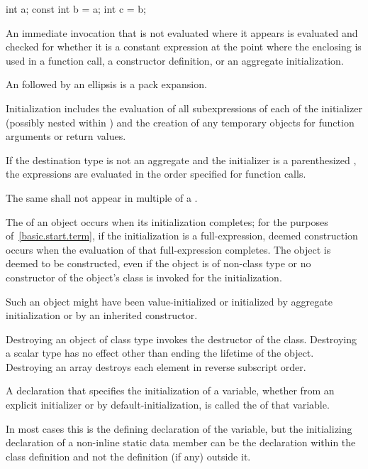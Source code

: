 \begin{itemize}
\begin{note}
\begin{codeblock}
int a;
const int b = a;
int c = b;
\end{codeblock}
\end{note}
\end{itemize}

\pnum
An immediate invocation that is not evaluated where
it appears
is evaluated and checked for whether it is
a constant expression at the point where
the enclosing  is used in
a function call, a constructor definition, or an aggregate initialization.

\pnum
An  followed by an ellipsis is a
pack expansion.

\pnum
Initialization includes
the evaluation of all subexpressions of
each  of
the initializer (possibly nested within ) and
the creation of any temporary objects for
function arguments or return values.

\pnum
If the destination type is not an aggregate
and the initializer is a parenthesized ,
the expressions are evaluated in the order
specified for function calls.

\pnum
The same 
shall not appear in multiple  of a
.

\pnum
The  of an object occurs when
its initialization completes;
for the purposes of~\ref{basic.start.term},
if the initialization is a full-expression,
deemed construction occurs when
the evaluation of that full-expression completes.
The object is deemed to be constructed,
even if the object is of non-class type or
no constructor of the object's class
is invoked for the initialization.
\begin{note}
Such an object might have been value-initialized
or initialized by aggregate initialization
or by an inherited constructor.
\end{note}
Destroying an object of class type invokes the destructor of the class.
Destroying a scalar type has no effect other than
ending the lifetime of the object.
Destroying an array destroys each element in reverse subscript order.

\pnum
A declaration that specifies the initialization of a variable,
whether from an explicit initializer or by default-initialization,
is called the  of that variable.
\begin{note}
In most cases
this is the defining declaration of the variable,
but the initializing declaration
of a non-inline static data member
can be the declaration within the class definition
and not the definition (if any) outside it.
\end{note}

